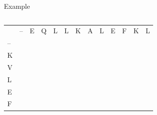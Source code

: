 \documentclass{bredelebeamer}
\begin{document}
\begin{frame}{Example}
\begin{columns}
\end{columns}
\begin{table}[]
\centering
\begin{tabular}{lllllllllllll}
                        & --                    & E                     & Q                     & L                     & L                     & K                     & A                     & L                     & E                     & F                     & K                     & L                     \\ \cline{2-13} 
\multicolumn{1}{l|}{--} & \multicolumn{1}{l|}{} & \multicolumn{1}{l|}{} & \multicolumn{1}{l|}{} & \multicolumn{1}{l|}{} & \multicolumn{1}{l|}{} & \multicolumn{1}{l|}{} & \multicolumn{1}{l|}{} & \multicolumn{1}{l|}{} & \multicolumn{1}{l|}{} & \multicolumn{1}{l|}{} & \multicolumn{1}{l|}{} & \multicolumn{1}{l|}{} \\ \cline{2-13} 
\multicolumn{1}{l|}{K}  & \multicolumn{1}{l|}{} & \multicolumn{1}{l|}{} & \multicolumn{1}{l|}{} & \multicolumn{1}{l|}{} & \multicolumn{1}{l|}{} & \multicolumn{1}{l|}{} & \multicolumn{1}{l|}{} & \multicolumn{1}{l|}{} & \multicolumn{1}{l|}{} & \multicolumn{1}{l|}{} & \multicolumn{1}{l|}{} & \multicolumn{1}{l|}{} \\ \cline{2-13} 
\multicolumn{1}{l|}{V}  & \multicolumn{1}{l|}{} & \multicolumn{1}{l|}{} & \multicolumn{1}{l|}{} & \multicolumn{1}{l|}{} & \multicolumn{1}{l|}{} & \multicolumn{1}{l|}{} & \multicolumn{1}{l|}{} & \multicolumn{1}{l|}{} & \multicolumn{1}{l|}{} & \multicolumn{1}{l|}{} & \multicolumn{1}{l|}{} & \multicolumn{1}{l|}{} \\ \cline{2-13} 
\multicolumn{1}{l|}{L}  & \multicolumn{1}{l|}{} & \multicolumn{1}{l|}{} & \multicolumn{1}{l|}{} & \multicolumn{1}{l|}{} & \multicolumn{1}{l|}{} & \multicolumn{1}{l|}{} & \multicolumn{1}{l|}{} & \multicolumn{1}{l|}{} & \multicolumn{1}{l|}{} & \multicolumn{1}{l|}{} & \multicolumn{1}{l|}{} & \multicolumn{1}{l|}{} \\ \cline{2-13} 
\multicolumn{1}{l|}{E}  & \multicolumn{1}{l|}{} & \multicolumn{1}{l|}{} & \multicolumn{1}{l|}{} & \multicolumn{1}{l|}{} & \multicolumn{1}{l|}{} & \multicolumn{1}{l|}{} & \multicolumn{1}{l|}{} & \multicolumn{1}{l|}{} & \multicolumn{1}{l|}{} & \multicolumn{1}{l|}{} & \multicolumn{1}{l|}{} & \multicolumn{1}{l|}{} \\ \cline{2-13} 
\multicolumn{1}{l|}{F}  & \multicolumn{1}{l|}{} & \multicolumn{1}{l|}{} & \multicolumn{1}{l|}{} & \multicolumn{1}{l|}{} & \multicolumn{1}{l|}{} & \multicolumn{1}{l|}{} & \multicolumn{1}{l|}{} & \multicolumn{1}{l|}{} & \multicolumn{1}{l|}{} & \multicolumn{1}{l|}{} & \multicolumn{1}{l|}{} & \multicolumn{1}{l|}{} \\ \cline{2-13} 

\end{tabular}
\end{table}
\end{frame}
\end{document}
